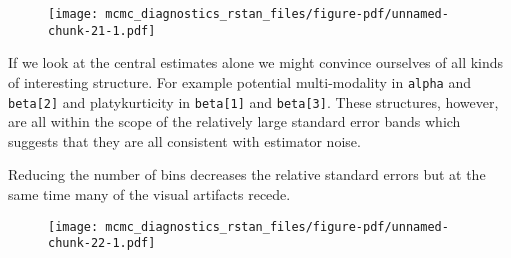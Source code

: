 \documentclass[
  letterpaper,
  DIV=11,
  numbers=noendperiod]{scrartcl}
\newenvironment{Shaded}{\begin{snugshade}}{\end{snugshade}}
\newcommand{\AttributeTok}[1]{\textcolor[rgb]{0.40,0.45,0.13}{#1}}
\newcommand{\DecValTok}[1]{\textcolor[rgb]{0.68,0.00,0.00}{#1}}
\newcommand{\FunctionTok}[1]{\textcolor[rgb]{0.28,0.35,0.67}{#1}}
\newcommand{\NormalTok}[1]{\textcolor[rgb]{0.00,0.23,0.31}{#1}}
\newcommand{\SpecialCharTok}[1]{\textcolor[rgb]{0.37,0.37,0.37}{#1}}
\newcommand{\StringTok}[1]{\textcolor[rgb]{0.13,0.47,0.30}{#1}}
\begin{document}
\begin{figure}[H]

{\centering \texttt{[image: mcmc\_diagnostics\_rstan\_files/figure-pdf/unnamed-chunk-21-1.pdf]}

}

\end{figure}

If we look at the central estimates alone we might convince ourselves of
all kinds of interesting structure. For example potential multi-modality
in \texttt{alpha} and \texttt{beta{[}2{]}} and platykurticity in
\texttt{beta{[}1{]}} and \texttt{beta{[}3{]}}. These structures,
however, are all within the scope of the relatively large standard error
bands which suggests that they are all consistent with estimator noise.

Reducing the number of bins decreases the relative standard errors but
at the same time many of the visual artifacts recede.

\begin{Shaded}
\end{Shaded}

\begin{figure}[H]

{\centering \texttt{[image: mcmc\_diagnostics\_rstan\_files/figure-pdf/unnamed-chunk-22-1.pdf]}

}

\end{figure}
\end{document}
